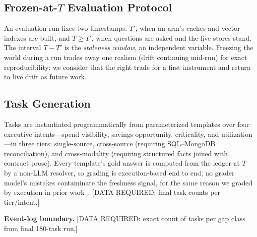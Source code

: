 \documentclass{ieeeaccess}
\begin{document}
\subsection{Frozen-at-$T$ Evaluation Protocol}
\label{sec:frozen}
An evaluation run fixes two timestamps: $T'$, when an arm's caches and vector
indexes are built, and $T \ge T'$, when questions are asked and the live stores
stand. The interval $T - T'$ is the \emph{staleness window}, an independent
variable. Freezing the world during a run trades away one realism (drift
continuing mid-run) for exact reproducibility; we consider that the right trade
for a first instrument and return to live drift as future work.

\subsection{Task Generation}
Tasks are instantiated programmatically from parameterized templates over four
executive intents---spend visibility, savings opportunity, criticality, and
utilization---in three tiers: single-source, cross-source (requiring
SQL--MongoDB reconciliation), and cross-modality (requiring structured facts
joined with contract prose). Every template's gold answer is computed from the
ledger at $T$ by a non-LLM resolver, so grading is execution-based end to end;
no grader model's mistakes contaminate the freshness signal, for the same
reason we graded by execution in prior work~\cite{par, tca}.
[DATA REQUIRED: final task counts per tier/intent.]

\textbf{Event-log boundary.}
%
%
%
[DATA REQUIRED: exact count of tasks per gap class from final 180-task run.]
\end{document}
